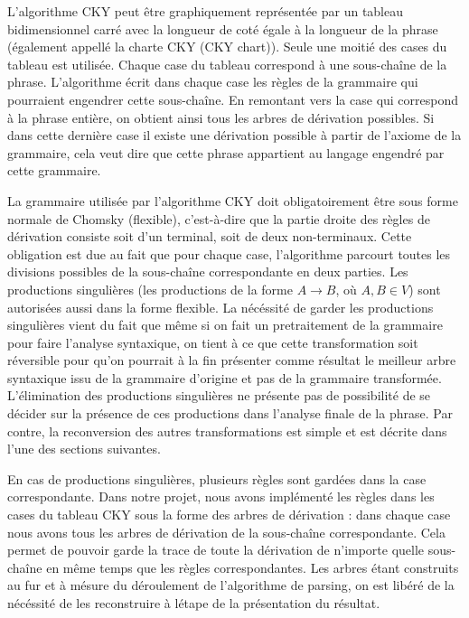 \documentclass[12pt]{article}
\begin{document}
L'algorithme CKY peut
\^etre graphiquement repr\'esent\'ee par un tableau bidimensionnel carr\'e avec la longueur 
de cot\'e \'egale \`a la longueur de la phrase (\'egalement appell\'e la charte CKY (CKY chart)).
Seule une moiti\'e des cases du tableau est utilis\'ee. Chaque case du tableau correspond \`a une sous-cha\^ine de la phrase.
L'algorithme \'ecrit dans chaque case les r\`egles de la grammaire qui pourraient
engendrer cette sous-cha\^ine. En remontant vers la case qui correspond \`a la
phrase enti\`ere, on obtient ainsi tous les arbres de d\'erivation possibles. Si
dans cette derni\`ere case il existe une d\'erivation possible \`a partir de l'axiome
de la grammaire, cela veut dire que cette phrase appartient au langage engendr\'e
par cette grammaire.\par

La grammaire utilis\'ee par l'algorithme CKY doit obligatoirement \^etre sous forme
normale de Chomsky (flexible), c'est-\`a-dire que la partie droite des r\`egles de
d\'erivation consiste soit d'un terminal, soit de deux non-terminaux. Cette obligation est
due au fait que pour chaque case, l'algorithme parcourt toutes les divisions possibles de la sous-cha\^ine
correspondante en deux parties. Les productions
singuli\`eres (les productions de la forme $A \rightarrow B$, o\`u $A,B \in V$) sont
autoris\'ees aussi dans la forme flexible. La n\'ec\'essit\'e de garder les
productions singuli\`eres vient du fait que m\^eme si on fait un pretraitement
de la grammaire pour faire l'analyse syntaxique, on tient \`a ce que cette
transformation soit r\'eversible pour qu'on pourrait \`a la fin pr\'esenter
comme r\'esultat le meilleur arbre syntaxique issu de la grammaire d'origine et
pas de la grammaire transform\'ee.
L'\'elimination des productions singuli\`eres ne pr\'esente pas de possibilit\'e de 
se d\'ecider sur la pr\'esence de ces productions dans l'analyse finale de la
phrase. Par contre, la reconversion des autres transformations est simple et est d\'ecrite dans l'une des
sections suivantes.
\par

En cas de productions singuli\`eres, plusieurs r\`egles sont gard\'ees dans la case
correspondante. Dans notre projet, nous avons impl\'ement\'e les r\`egles dans les
cases du tableau CKY sous la forme des arbres de d\'erivation : dans chaque case
nous avons tous les arbres de d\'erivation de la sous-cha\^ine correspondante. Cela
permet de pouvoir garde la trace de toute la d\'erivation de n'importe quelle
sous-cha\^ine en m\^eme temps que les r\`egles correspondantes. Les arbres \'etant construits
au fur et \`a m\'esure du d\'eroulement de l'algorithme de parsing, on est lib\'er\'e de la n\'ec\'essit\'e
de les reconstruire \`a l\'etape de la pr\'esentation du r\'esultat.
\end{document}
